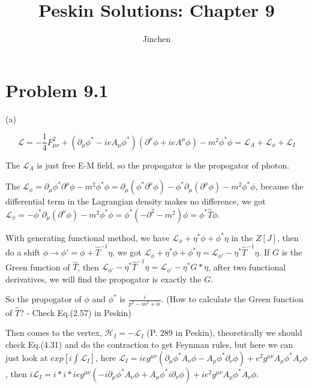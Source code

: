 \documentclass[11pt]{article} %
\title{Peskin Solutions: Chapter 9}
\author{Jinchen}
\begin{document}
\maketitle

\section{Problem 9.1}

\noindent (a)

\[
    \mathcal{L} = - \frac{1}{4} F^2_{\mu \nu} + (\partial_{\mu} \phi^* - i e A_{\mu} \phi^*)(\partial^{\mu} \phi + i e A^{\mu} \phi) - m^2 \phi^* \phi = \mathcal{L}_{A} + \mathcal{L}_{\phi} + \mathcal{L}_{I}
\]

The $\mathcal{L}_{A}$ is just free E-M field, so the propogator is the propogator of photon. 

The $\mathcal{L}_{\phi} = \partial_{\mu} \phi^* \partial^{\mu} \phi - m^2 \phi^* \phi = \partial_{\mu} (\phi^* \partial^{\mu} \phi) - \phi^* \partial_{\mu} (\partial^{\mu} \phi) - m^2 \phi^* \phi$, because the differential term in the Lagrangian density makes no difference, we got $\mathcal{L}_{\phi} = - \phi^* \partial_{\mu} (\partial^{\mu} \phi) - m^2 \phi^* \phi = \phi^* (- \partial^2 - m^2) \phi = \phi^* \hat{T} \phi$.

With generating functional method, we have $\mathcal{L}_{\phi} + \eta^* \phi + \phi^* \eta$ in the $Z[J]$, then do a shift $\phi \to \phi' = \phi + \hat{T}^{-1} \eta$, we got $\mathcal{L}_{\phi} + \eta^* \phi + \phi^* \eta = \mathcal{L}_{\phi'} - \eta^* \hat{T}^{-1} \eta$. If $G$ is the Green function of $\hat{T}$, then $\mathcal{L}_{\phi'} - \eta^* \hat{T}^{-1} \eta = \mathcal{L}_{\phi'} - \eta^* G * \eta$, after two functional derivatives, we will find the propogator is exactly the $G$.

So the propogator of $\phi$ and $\phi^*$ is $\frac{i}{p^2 - m^2 + i \epsilon}$. (How to calculate the Green function of $\hat{T}$? - Check Eq.(2.57) in Peskin)

Then comes to the vertex, $\mathcal{H}_{I} = - \mathcal{L}_I$ (P. 289 in Peskin), theoretically we should check Eq.(4.31) and do the contraction to get Feynman rules, but here we can just look at $exp[i \int \mathcal{L}_I]$, here $\mathcal{L}_I = i e g^{\mu \nu} (\partial_{\mu} \phi^* A_{\nu} \phi - A_{\mu} \phi^* \partial_{\nu} \phi) + e^2 g^{\mu \nu} A_{\mu} \phi^* A_{\nu} \phi$, then $i \mathcal{L}_I = i * i * i e g^{\mu \nu} (-i \partial_{\mu} \phi^* A_{\nu} \phi + A_{\mu} \phi^* i \partial_{\nu} \phi) + i e^2 g^{\mu \nu} A_{\mu} \phi^* A_{\nu} \phi$.
\end{document}
